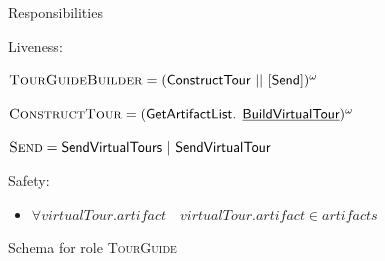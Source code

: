 \documentclass[paper=letter, fontsize=12pt]{article}
\begin{document}
\begin{figure}[H]
\begin{center}
{{\setlength\parindent{14pt} Responsibilities
\par \setlength\parindent{14pt} Liveness:
\par\setlength\parindent{75pt}$\text{\textsc{TourGuideBuilder}} = (\text{{\fontfamily{\sfdefault}\selectfont 
ConstructTour || $[$Send$]$}})^{\omega}$
\par\setlength\parindent{75pt}$\text{\textsc{ConstructTour}} = (\text{{\fontfamily{\sfdefault}\selectfont 
GetArtifactList. \text{\underline{BuildVirtualTour}}}})^{\omega}$
\par\setlength\parindent{75pt}$\text{\textsc{Send}} = \text{{\fontfamily{\sfdefault}\selectfont 
SendVirtualTours | SendVirtualTour}}$

\par \setlength\parindent{14pt} Safety:
\begin{itemize}[leftmargin=20mm]
\item $\forall virtualTour.artifact \quad virtualTour.artifact \in artifacts$
\end{itemize}
    }%
}
\caption{Schema for role \textsc{TourGuide}}
\label{fig:role_tour_guide}
\end{center}
\end{figure}
\end{document}
